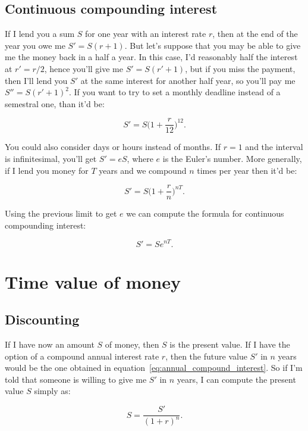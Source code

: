 \subsection{Continuous compounding interest}
If I lend you a sum $S$ for one year with an interest rate $r$, then at the end of the year you owe me $S'=S(r+1)$. But let's suppose that you may be able to give me the money back in a half a year. In this case, I'd reasonably half the interest at $r'=r/2$, hence you'll give me $S'=S(r'+1)$, but if you miss the payment, then I'll lend you $S'$ at the same interest for another half year, so you'll pay me $S''=S(r'+1)^2$.
If you want to try to set a monthly deadline instead of a semestral one, than it'd be:

\begin{equation}\label{eq:tmp}
S'=S\bigg(1+\dfrac{r}{12}\bigg)^{12}.
\end{equation}

You could also consider days or hours instead of months. If $r=1$ and the interval is infinitesimal, you'll get $S'=eS$, where $e$ is the Euler's number. More generally, if I lend you money for $T$ years and we compound $n$ times per year then it'd be:

\begin{equation}\label{eq:tmp_general}
S'=S\bigg(1+\dfrac{r}{n}\bigg)^{nT}.
\end{equation}

Using the previous limit to get $e$ we can compute the formula for continuous compounding interest:

\begin{equation}\label{eq:continuous_compounding_interest}
S'=Se^{nT}.
\end{equation}

\section{Time value of money}
\subsection{Discounting}
If I have now an amount $S$ of money, then $S$ is the present value. If I have the option of a compound annual interest rate $r$, then the future value $S'$ in $n$ years would be the one obtained in equation~\ref{eq:annual_compound_interest}. So if I'm told that someone is willing to give me $S'$ in $n$ years, I can compute the present value $S$ simply as:

\begin{equation}\label{eq:annual_discount_interest}
S = \dfrac{S'}{(1+r)^n} .
\end{equation}

